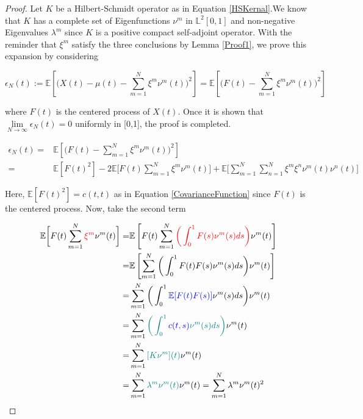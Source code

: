 \documentclass[11pt,twoside,a4paper]{article}
\begin{document}
	\begin{proof}
		
		Let $K$ be a Hilbert-Schmidt operator as in Equation \ref{HSKernal}.We know that $K$ has a complete set of Eigenfunctions ${\nu^m}$ in $\mathbb{L}^{2}[0,1]$  and non-negative Eigenvalues $\lambda^m$ since $K$ is a positive compact self-adjoint operator. With the reminder that $\xi^m$ satisfy the three conclusions by Lemma \ref{Proof1}, we prove this expansion by considering
		
		\begin{equation}
			\epsilon_{N}(t) := \mathbb{E} \left[\bigg( X(t) -\mu(t)- \sum_{m=1}^{N} \xi^m \nu^m(t)\bigg)^2 \right]
			= \mathbb{E} \left[\bigg( F(t) - \sum_{m=1}^{N} \xi^m \nu^m(t)\bigg)^2 \right]
		\end{equation}
	
		where $F(t)$ is the centered process of $X(t)$.
		Once it is shown that $\lim\limits_{N \rightarrow \infty} \epsilon_{N}(t) = 0$ uniformly in [0,1], the proof is completed.
		
		\begin{equation}\label{Thr1}
			\begin{split}
				\epsilon_{N}(t) = &\mathbb{E} \left[\bigg( F(t) - \sum_{m=1}^{N} \xi^m 	\nu^m(t)\bigg)^2 \right]\\
				= & \mathbb{E}[F(t)^{2}] - 2\mathbb{E}\bigg[F(t)\sum_{m=1}^{N}\xi^m\nu^m(t)\bigg] + \mathbb{E}\bigg[\sum_{m=1}^{N}\sum_{n=1}^{N}\xi^m\xi^n\nu^m(t)\nu^n(t)\bigg]
			\end{split}
		\end{equation}
		
		Here, $\mathbb{E}[F(t)^{2}] = c(t,t)$ as in Equation \ref{CovarianceFunction} since $F(t)$ is the centered process. Now, take the second term
		
		\begin{equation}\label{Thr2}
			\begin{split}
				\mathbb{E} \bigg[ F(t) \sum_{m=1}^{N} {\color{red}\xi^m}\nu^m(t) \bigg] = & \mathbb{E} \left[ F(t) \sum_{m=1}^{N} {\color{red}\bigg(\int_{0}^{1} F(s)\nu^m(s)ds\bigg)} \nu^m(t) \right]\\
				= & \mathbb{E} \left[ \sum_{m=1}^{N} \bigg(\int_{0}^{1} F(t)F(s)\nu^m(s)ds\bigg) \nu^m(t) \right]\\
				= & \sum_{m=1}^{N} \bigg(\int_{0}^{1} {\color{blue}\mathbb{E}[F(t)F(s)]}\nu^m(s)ds\bigg)\nu^m(t)\\
				= & \sum_{m=1}^{N} {\color{teal}\bigg(\int_{0}^{1} {\color{blue}c(t,s)} \nu^m(s)ds\bigg)}\nu^m(t)\\
				= & \sum_{m=1}^{N}{\color{teal}[K\nu^m](t)}\nu^m(t) \\
				= &\sum_{m=1}^{N}{\color{teal}\lambda^m\nu^m(t)}\nu^m(t) = \sum_{m=1}^{N}\lambda^m\nu^m(t)^{2}
			\end{split}
		\end{equation} 
		

\end{proof}
\end{document}
